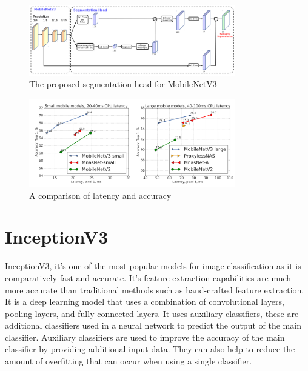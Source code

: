 \documentclass[]{final_report}
\begin{document}
\begin{figure}[ht!]
  \centering
  \includegraphics[width=0.8\textwidth]{images/MobileNetv3-structure.png}
  \caption{The proposed segmentation head for MobileNetV3\cite{DBLP:journals/corr/abs-1905-02244}}
  \label{fig:mobilenetv3-segmentation}
\end{figure}

\begin{figure}[ht!]
  \centering
  \includegraphics[width=0.8\textwidth]{images/mobilenet-comparison.png}
  \caption{A comparison of latency and accuracy\cite{DBLP:journals/corr/abs-1905-02244}}
  \label{fig:mobilenetv3-comparison}
\end{figure}


\section{InceptionV3}
InceptionV3\cite{DBLP:journals/corr/SzegedyVISW15}, it's one of the most popular models for image classification as it is comparatively fast and accurate.
It's feature extraction capabilities are much more accurate than traditional methods such as hand-crafted feature extraction.
It is a deep learning model that uses a combination of convolutional layers, pooling layers, and fully-connected layers.
It uses auxiliary classifiers, these are additional classifiers used in a neural network to predict the output of the main classifier. Auxiliary classifiers are used to improve the accuracy of the main classifier by providing additional input data.
They can also help to reduce the amount of overfitting that can occur when using a single classifier.
\end{document}
